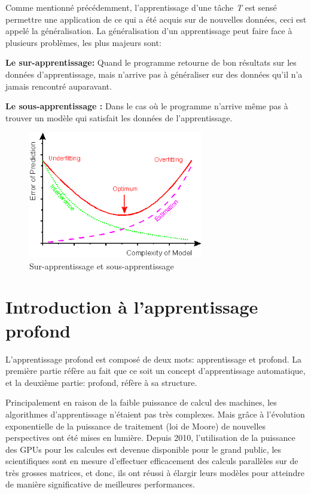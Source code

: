 Comme mentionné précédemment, l'apprentissage d'une tâche \textit{T} est sensé permettre une application de ce qui a été acquis sur de nouvelles données, ceci est appelé la généralisation.
La généralisation d'un apprentissage peut faire face à plusieurs problèmes, les plus majeurs sont:

\textbf{Le sur-apprentissage:} Quand le programme retourne de bon résultats sur les données d'apprentissage, mais n'arrive pas à généraliser sur des données qu'il n'a jamais rencontré auparavant.

\textbf{Le sous-apprentissage :} Dans le cas où le programme n'arrive même pas à trouver un modèle qui satisfait les données de l'apprentissage.


\begin{figure}[H]
	\centering
		\includegraphics[width=3in]{Figures/image024.png}
	\caption[An Electron]{Sur-apprentissage et sous-apprentissage}
	\label{fig:Electron}
\end{figure}

\section{Introduction à l'apprentissage profond}

L'apprentissage profond est composé de deux mots: apprentissage et profond. La première partie réfère au fait que ce soit un concept d'apprentissage automatique, et la deuxième partie: profond, réfère à sa structure.

Principalement en raison de la faible puissance de calcul des machines, les algorithmes d'apprentissage n'étaient pas très complexes. Mais grâce à l'évolution exponentielle de la puissance de traitement (loi de Moore) de nouvelles perspectives ont été mises en lumière.
Depuis 2010, l'utilisation de la puissance des GPUs pour les calcules est devenue disponible pour le grand public, les scientifiques sont en mesure d'effectuer efficacement des calculs parallèles sur de très grosses matrices, et donc, ils ont réussi à élargir leurs modèles pour atteindre de manière significative de meilleures performances.


